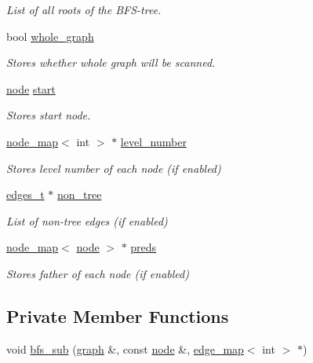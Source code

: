 \begin{DoxyCompactItemize}
\begin{DoxyCompactList}\small\item\em List of all roots of the B\+F\+S-\/tree. \end{DoxyCompactList}\item 
bool \mbox{\hyperlink{classbfs_a6c08fbcc90d71f1cbdd03a1cdaa9dc99}{whole\+\_\+graph}}
\begin{DoxyCompactList}\small\item\em Stores whether whole graph will be scanned. \end{DoxyCompactList}\item 
\mbox{\hyperlink{classnode}{node}} \mbox{\hyperlink{classbfs_af2ab561d9e60a9fc2e25b02d1f807f96}{start}}
\begin{DoxyCompactList}\small\item\em Stores start node. \end{DoxyCompactList}\item 
\mbox{\hyperlink{classnode__map}{node\+\_\+map}}$<$ int $>$ $\ast$ \mbox{\hyperlink{classbfs_aab92e9d128612c28324aafe4750dbc84}{level\+\_\+number}}
\begin{DoxyCompactList}\small\item\em Stores level number of each node (if enabled) \end{DoxyCompactList}\item 
\mbox{\hyperlink{edge_8h_a8f9587479bda6cf612c103494b3858e3}{edges\+\_\+t}} $\ast$ \mbox{\hyperlink{classbfs_a056b2131db11e62eb8f41c8dcc117d2e}{non\+\_\+tree}}
\begin{DoxyCompactList}\small\item\em List of non-\/tree edges (if enabled) \end{DoxyCompactList}\item 
\mbox{\hyperlink{classnode__map}{node\+\_\+map}}$<$ \mbox{\hyperlink{classnode}{node}} $>$ $\ast$ \mbox{\hyperlink{classbfs_a3bac5ed333bb78a30a67099c3b94aa0c}{preds}}
\begin{DoxyCompactList}\small\item\em Stores father of each node (if enabled) \end{DoxyCompactList}\end{DoxyCompactItemize}
\subsection*{Private Member Functions}
\begin{DoxyCompactItemize}
\item 
void \mbox{\hyperlink{classbfs_a567815d3b63e802420f4b536749a1ad2}{bfs\+\_\+sub}} (\mbox{\hyperlink{classgraph}{graph}} \&, const \mbox{\hyperlink{classnode}{node}} \&, \mbox{\hyperlink{classedge__map}{edge\+\_\+map}}$<$ int $>$ $\ast$)
\end{DoxyCompactItemize}


